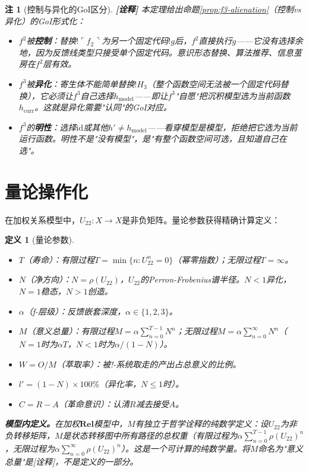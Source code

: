 \documentclass[11pt,a4paper]{article}
\newtheorem{definition}{定义}
\newtheorem{remark}{注}
\newcommand{\lvl}[1]{\hfill\textbf{\footnotesize[#1]}}
\newcommand{\lvI}{\lvl{诠释}}
\newcommand{\bang}{{!}}
\begin{document}
\begin{remark}[控制与异化的GoI区分]\lvI
本定理给出命题\ref{prop:f3-alienation}（控制vs异化）的GoI形式化：
\begin{itemize}
  \item $f^2$被\textbf{控制}：替换$\bang\ulcorner f_2\urcorner$为另一个固定代码$\bang g$后，$f^2$直接执行$g$——它没有选择余地，因为反馈线类型只接受单个固定代码。意识形态替换、算法推荐、信息茧房在$f^2$层有效。
  \item $f^3$被\textbf{异化}：寄生体不能简单替换$\bang H_3$（整个函数空间无法被一个固定代码替换），它必须让$f^3$\emph{自己选择}$h_{\text{model}}$——即让$f^3$"自愿"把沉积模型选为当前函数$h_{\text{curr}}$。这就是异化需要"认同"的GoI对应。
  \item $f^3$的\textbf{明性}：选择$\mathrm{id}$或其他$h'\neq h_{\text{model}}$——看穿模型是模型，拒绝把它选为当前运行函数。明性不是"没有模型"，是"有整个函数空间可选，且知道自己在选"。
\end{itemize}
\end{remark}

\section{量论操作化}

在加权关系模型中，$U_{22}:X\to X$是非负矩阵。量论参数获得精确计算定义：

\begin{definition}[量论参数]
~
\begin{itemize}
\item $T$（寿命）：有限过程$T=\min\{n:U_{22}^n=0\}$（幂零指数）；无限过程$T=\infty$。
\item $N$（净方向）：$N=\rho(U_{22})$，$U_{22}$的Perron-Frobenius谱半径。$N<1$异化，$N=1$稳态，$N>1$创造。
\item $\alpha$（f-层级）：反馈嵌套深度，$\alpha\in\{1,2,3\}$。
\item $M$（意义总量）：有限过程$M=\alpha\sum_{n=0}^{T-1}N^n$；无限过程$M=\alpha\sum_{n=0}^\infty N^n$（$N=1$时为$\alpha T$，$N<1$时为$\alpha/(1-N)$）。
\item $W=O/M$（萃取率）：被!-系统取走的产出占总意义的比例。
\item $l'=(1-N)\times100\%$（异化率，$N\leq1$时）。
\item $C=R-A$（革命意识）：认清$R$减去接受$A$。
\end{itemize}

\noindent\textbf{模型内定义。}在加权$\mathbf{Rel}$模型中，$M$有独立于哲学诠释的纯数学定义：设$U_{22}$为非负转移矩阵，$M$是状态转移图中所有路径的总权重（有限过程为$\alpha\sum_{n=0}^{T-1}\rho(U_{22})^n$，无限过程为$\alpha\sum_{n=0}^{\infty}\rho(U_{22})^n$）。这是一个可计算的纯数学量。将$M$命名为"意义总量"是[诠释]，不是定义的一部分。
\end{definition}
\end{document}

